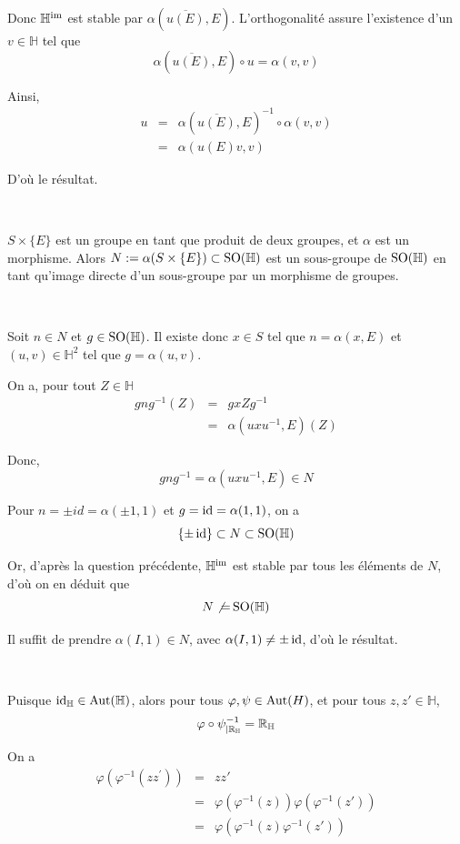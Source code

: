 Donc $\mathbb{H}^{\operatorname{im}}$ est stable par $\alpha (\overline{u (E)}, E)$.
L'orthogonalit{\'e} assure l'existence d'un $v \in \mathbb{H}$ tel que
\[ \alpha (\overline{u (E)}, E) \circ u = \alpha (v, v) \]


Ainsi,
\begin{eqnarray*}
  u & = & \alpha (\overline{u (E)}, E)^{- 1} \circ \alpha (v, v)\\
  & = & \alpha (u (E) v, v)
\end{eqnarray*}


D'o{\`u} le r{\'e}sultat.

\

 $S \times \{ E \}$ est un groupe en tant que produit de deux
groupes, et $\alpha$ est un morphisme. Alors $N := \alpha (S \times \{ E
\}) \subset \operatorname{SO} (\mathbb{H})$ est un sous-groupe de $\operatorname{SO}
(\mathbb{H})$ en tant qu'image directe d'un sous-groupe par un morphisme de
groupes.

\

Soit $n \in N$ et $g \in \operatorname{SO} (\mathbb{H})$. Il existe donc $x \in S$
tel que $n = \alpha (x, E)$ et $(u, v) \in \mathbb{H}^2$ tel que $g = \alpha
(u, v)$.

On a, pour tout $Z \in \mathbb{H}$
\begin{eqnarray*}
  g n g^{- 1} (Z) & = & g x Z g^{- 1}\\
  & = & \alpha (u x u^{- 1}, E) (Z)
\end{eqnarray*}


Donc,
\[ g n g^{- 1} = \alpha (u x u^{- 1}, E) \in N \]


Pour $n = \pm i d = \alpha (\pm 1, 1)$ et $g = \operatorname{id} = \alpha (1, 1)$, on
a
\[ \{ \pm \operatorname{id} \} \subset N \subset \operatorname{SO} (\mathbb{H}) \]


Or, d'apr{\`e}s la question pr{\'e}c{\'e}dente, $\mathbb{H}^{\operatorname{im}}$ est
stable par tous les {\'e}l{\'e}ments de $N$, d'o{\`u} on en d{\'e}duit que
\[ N \not{=} \operatorname{SO} (\mathbb{H}) \]


Il suffit de prendre $\alpha (I, 1) \in N$, avec $\alpha (I, 1) \neq \pm
\operatorname{id}$, d'o{\`u} le r{\'e}sultat.

\

 Puisque $\operatorname{id}_{\mathbb{H}} \in \operatorname{Aut} (\mathbb{H})$,
alors pour tous $\varphi, \psi \in \operatorname{Aut} (H)$, et pour tous $z, z' \in
\mathbb{H}$,
\[ \varphi \circ \psi^{- 1}_{| \mathbb{R}_{\mathbb{H}} }
   =\mathbb{R}_{\mathbb{H}} \]


On a
\begin{eqnarray*}
  \varphi (\varphi^{- 1} (z z^{'})) & = & z z'\\
  & = & \varphi (\varphi^{- 1} (z)) \varphi (\varphi^{- 1} (z'))\\
  & = & \varphi (\varphi^{- 1} (z) \varphi^{- 1} (z'))
\end{eqnarray*}


